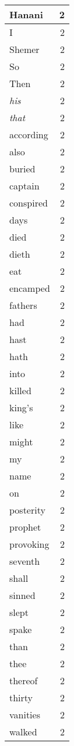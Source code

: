 \begin{center}
\begin{longtable}{l|r}
Hanani & 2 \\ \hline
I & 2 \\ \hline
Shemer & 2 \\ \hline
So & 2 \\ \hline
Then & 2 \\ \hline
\emph{his} & 2 \\ \hline
\emph{that} & 2 \\ \hline
according & 2 \\ \hline
also & 2 \\ \hline
buried & 2 \\ \hline
captain & 2 \\ \hline
conspired & 2 \\ \hline
days & 2 \\ \hline
died & 2 \\ \hline
dieth & 2 \\ \hline
eat & 2 \\ \hline
encamped & 2 \\ \hline
fathers & 2 \\ \hline
had & 2 \\ \hline
hast & 2 \\ \hline
hath & 2 \\ \hline
into & 2 \\ \hline
killed & 2 \\ \hline
king's & 2 \\ \hline
like & 2 \\ \hline
might & 2 \\ \hline
my & 2 \\ \hline
name & 2 \\ \hline
on & 2 \\ \hline
posterity & 2 \\ \hline
prophet & 2 \\ \hline
provoking & 2 \\ \hline
seventh & 2 \\ \hline
shall & 2 \\ \hline
sinned & 2 \\ \hline
slept & 2 \\ \hline
spake & 2 \\ \hline
than & 2 \\ \hline
thee & 2 \\ \hline
thereof & 2 \\ \hline
thirty & 2 \\ \hline
vanities & 2 \\ \hline
walked & 2 \\ \hline

\end{longtable}
\end{center}
